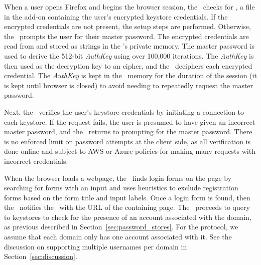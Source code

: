 When a user opens Firefox and begins the browser session, the \Core\ checks for , a file in the add-on containing the user's encrypted keystore credentials. If the encrypted credentials are not present, the setup steps are performed. Otherwise, the \Core\ prompts the user for their master password. The encrypted credentials are read from  and stored as strings in the \Core's private memory. The master password is used to derive the 512-bit \emph{AuthKey} using  over 100,000 iterations. The \emph{AuthKey} is then used as the decryption key to an  cipher, and the \Core\ deciphers each encrypted credential.  The \emph{AuthKey} is kept in the \Core\ memory for the duration of the session (it is kept until browser is closed) to avoid needing to repeatedly request the master password.  

Next, the \Core\ verifies the user's keystore credentials by initiating a connection to each keystore. If the request fails, the user is presumed to have given an incorrect master password, and the \Core\ returns to prompting for the master password. There is no enforced limit on password attempts at the client side, as all verification is done online and subject to AWS or Azure policies for making many requests with incorrect credentials. 
  



When the browser loads a webpage, the \UI\ finds login forms on the page by searching for forms with an input  and uses heuristics to exclude registration forms based on the form title and input labels. Once a login form is found, then the \UI\ notifies the \Core\ with the URL of the containing page. The \Core\ proceeds to query to keystores to check for the presence of an account associated with the domain, as previous described in Section~\ref{sec:password_stores}. For the protocol, we assume that each domain only has one account associated with it. See the discussion on supporting multiple usernames per domain in Section~\ref{sec:discussion}.

